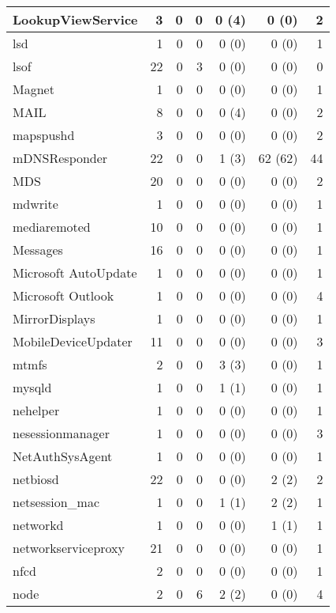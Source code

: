 \begin{adjustwidth}{-2in}{}
\begin{scriptsize}
\begin{longtable}[l]{ l | r | r | r | r | r | r }
    LookupViewService &  3 &  0 &  0 &  0 (4) &  0 (0) &  2 \\ \hline
    lsd &  1 &  0 &  0 &  0 (0) &  0 (0) &  1 \\ \hline
    lsof &  22 &  0 &  3 &  0 (0) &  0 (0) &  0 \\ \hline
    Magnet & 1 &  0 &  0 &  0 (0) &  0 (0) &  1 \\ \hline
    MAIL & 8 &  0 &  0 &  0 (4) &  0 (0) &  2 \\ \hline
    mapspushd &  3 &  0 &  0 &  0 (0) &  0 (0) &  2 \\ \hline
    mDNSResponder & 22 &  0 &  0 &  1 (3) &  62 (62) & 44 \\ \hline
    MDS & 20 &  0 &  0 &  0 (0) &  0 (0) &  2 \\ \hline
    mdwrite &  1 &  0 &  0 &  0 (0) &  0 (0) &  1 \\ \hline
    mediaremoted &  10 &  0 &  0 &  0 (0) &  0 (0) &  1 \\ \hline
    Messages &  16 &  0 &  0 &  0 (0) &  0 (0) &  1 \\ \hline
    Microsoft AutoUpdate &  1 &  0 &  0 &  0 (0) &  0 (0) &  1 \\ \hline
    Microsoft Outlook & 1 &  0 &  0 &  0 (0) &  0 (0) &  4 \\ \hline
    MirrorDisplays & 1 &  0 &  0 &  0 (0) &  0 (0) &  1 \\ \hline
    MobileDeviceUpdater & 11 &  0 &  0 &  0 (0) &  0 (0) &  3 \\ \hline
    mtmfs &  2 &  0 &  0 &  3 (3) &  0 (0) &  1 \\ \hline
    mysqld & 1 &  0 &  0 &  1 (1) &  0 (0) &  1 \\ \hline
    nehelper & 1 &  0 &  0 &  0 (0) &  0 (0) &  1 \\ \hline
    nesessionmanager & 1 &  0 &  0 &  0 (0) &  0 (0) &  3 \\ \hline
    NetAuthSysAgent &  1 &  0 &  0 &  0 (0) &  0 (0) &  1 \\ \hline
    netbiosd &  22 &  0 &  0 &  0 (0) &  2 (2) &  2 \\ \hline
    netsession\_mac & 1 &  0 &  0 &  1 (1) &  2 (2) &  1 \\ \hline
    networkd & 1 &  0 &  0 &  0 (0) &  1 (1) &  1 \\ \hline
    networkserviceproxy & 21 &  0 &  0 &  0 (0) &  0 (0) &  1 \\ \hline
    nfcd & 2 &  0 &  0 &  0 (0) &  0 (0) &  1 \\ \hline
    node & 2 &  0 &  6 &  2 (2) &  0 (0) &  4 \\ \hline

\end{longtable}
\end{scriptsize}
\end{adjustwidth}

